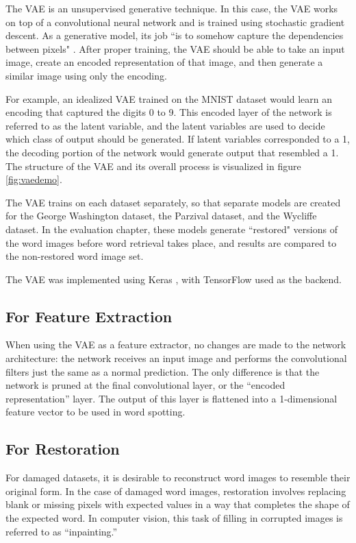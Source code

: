 \documentclass[final]{ukthesis}
\begin{document}
The VAE is an unsupervised generative technique. In this case, the VAE works on top of a convolutional neural network and is trained using stochastic gradient descent. As a generative model, its job ``is to somehow capture the dependencies between pixels" \cite{doersch2016tutorial}. After proper training, the VAE should be able to take an input image, create an encoded representation of that image, and then generate a similar image using only the encoding.

For example, an idealized VAE trained on the MNIST dataset would learn an encoding that captured the digits 0 to 9. This encoded layer of the network is referred to as the latent variable, and the latent variables are used to decide which class of output should be generated. If latent variables corresponded to a 1, the decoding portion of the network would generate output that resembled a 1. The structure of the VAE and its overall process is visualized in figure \ref{fig:vaedemo}.

The VAE trains on each dataset separately, so that separate models are created for the George Washington dataset, the Parzival dataset, and the Wycliffe dataset. In the evaluation chapter, these models generate ``restored" versions of the word images before word retrieval takes place, and results are compared to the non-restored word image set.

The VAE was implemented using Keras \cite{chollet2015keras}, with TensorFlow \cite{abadi2016tensorflow} used as the backend.

\subsection{For Feature Extraction}
When using the VAE as a feature extractor, no changes are made to the network architecture: the network receives an input image and performs the convolutional filters just the same as a normal prediction. The only difference is that the network is pruned at the final convolutional layer, or the ``encoded representation'' layer. The output of this layer is flattened into a 1-dimensional feature vector to be used in word spotting.

\subsection{For Restoration}
For damaged datasets, it is desirable to reconstruct word images to resemble their original form. In the case of damaged word images, restoration involves replacing blank or missing pixels with expected values in a way that completes the shape of the expected word. In computer vision, this task of filling in corrupted images is referred to as ``inpainting.''
\end{document}
